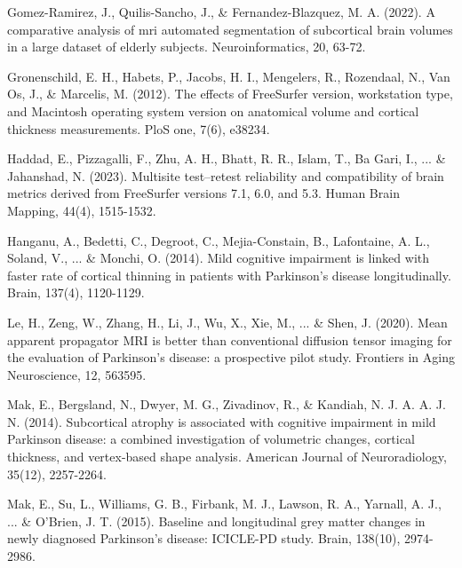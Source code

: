Gomez-Ramirez, J., Quilis-Sancho, J., \& Fernandez-Blazquez, M. A. (2022). A comparative analysis of mri automated segmentation of subcortical brain volumes in a large dataset of elderly subjects. Neuroinformatics, 20, 63-72.

Gronenschild, E. H., Habets, P., Jacobs, H. I., Mengelers, R., Rozendaal, N., Van Os, J., \& Marcelis, M. (2012). The effects of FreeSurfer version, workstation type, and Macintosh operating system version on anatomical volume and cortical thickness measurements. PloS one, 7(6), e38234.

Haddad, E., Pizzagalli, F., Zhu, A. H., Bhatt, R. R., Islam, T., Ba Gari, I., ... \& Jahanshad, N. (2023). Multisite test–retest reliability and compatibility of brain metrics derived from FreeSurfer versions 7.1, 6.0, and 5.3. Human Brain Mapping, 44(4), 1515-1532.

Hanganu, A., Bedetti, C., Degroot, C., Mejia-Constain, B., Lafontaine, A. L., Soland, V., ... \& Monchi, O. (2014). Mild cognitive impairment is linked with faster rate of cortical thinning in patients with Parkinson’s disease longitudinally. Brain, 137(4), 1120-1129.




Le, H., Zeng, W., Zhang, H., Li, J., Wu, X., Xie, M., ... \& Shen, J. (2020). Mean apparent propagator MRI is better than conventional diffusion tensor imaging for the evaluation of Parkinson’s disease: a prospective pilot study. Frontiers in Aging Neuroscience, 12, 563595.

Mak, E., Bergsland, N., Dwyer, M. G., Zivadinov, R., \& Kandiah, N. J. A. A. J. N. (2014). Subcortical atrophy is associated with cognitive impairment in mild Parkinson disease: a combined investigation of volumetric changes, cortical thickness, and vertex-based shape analysis. American Journal of Neuroradiology, 35(12), 2257-2264.

Mak, E., Su, L., Williams, G. B., Firbank, M. J., Lawson, R. A., Yarnall, A. J., ... \& O’Brien, J. T. (2015). Baseline and longitudinal grey matter changes in newly diagnosed Parkinson’s disease: ICICLE-PD study. Brain, 138(10), 2974-2986.

